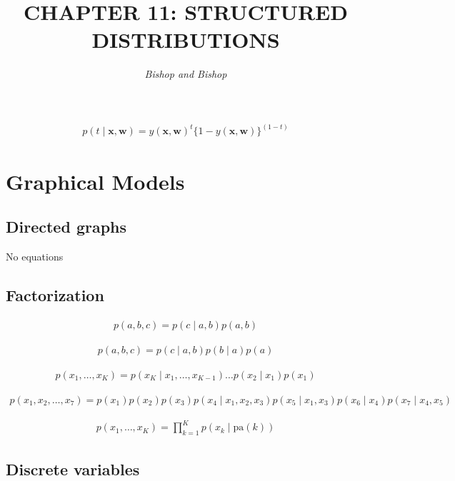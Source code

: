 \documentclass{article}
\title{\LARGE\scshape\MakeUppercase{Chapter 11: Structured Distributions}}
\author{\textit{Bishop and Bishop}}
\date{}
\begin{document}
\maketitle

\begin{align*}
p(t \mid \mathbf{x}, \mathbf{w})=y(\mathbf{x}, \mathbf{w})^{t}\{1-y(\mathbf{x}, \mathbf{w})\}^{(1-t)} \tag{11.1}
\end{align*}

\section{Graphical Models}

\subsection{Directed graphs}
No equations

\subsection{Factorization}

\begin{align*}
p(a, b, c) = p(c \mid a, b) p(a, b) 
\tag{11.2}
\end{align*}

\begin{align*}
p(a, b, c)=p(c \mid a, b) p(b \mid a) p(a) 
\tag{11.3}
\end{align*}

\begin{align*}
p\left(x_{1}, \ldots, x_{K}\right)=p\left(x_{K} \mid x_{1}, \ldots, x_{K-1}\right) \ldots p\left(x_{2} \mid x_{1}\right) p\left(x_{1}\right)
\tag{11.4}
\end{align*}

\begin{align*}
p\left(x_{1}, x_{2}, \ldots, x_{7}\right)=p\left(x_{1}\right) p\left(x_{2}\right) p\left(x_{3}\right) p\left(x_{4} \mid x_{1}, x_{2}, x_{3}\right) p\left(x_{5} \mid x_{1}, x_{3}\right) p\left(x_{6} \mid x_{4}\right) p\left(x_{7} \mid x_{4}, x_{5}\right) 
\tag{11.5}
\end{align*}

\begin{align*}
p\left(x_{1}, \ldots, x_{K}\right)=\prod_{k=1}^{K} p\left(x_{k} \mid \mathrm{pa}(k)\right)
\tag{11.6}
\end{align*}

\subsection{Discrete variables}
\end{document}

